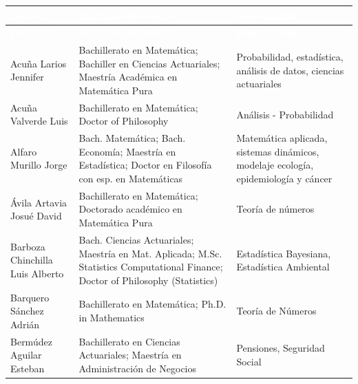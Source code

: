 
\begingroup
\small
\setlength{\tabcolsep}{4.5pt}%
\renewcommand{\arraystretch}{1.2}%
%
\setlength{\arrayrulewidth}{0.5pt}%
\begin{landscape}

\begin{longtable}{|>{\raggedright\arraybackslash}p{5cm}|>{\raggedright\arraybackslash}p{9.8cm}|>{\raggedright\arraybackslash}p{5.6cm}|}
\hline
\rowcolor{Azul-UCR}
\textcolor{white}{\textbf{Docente}} & \textcolor{white}{\textbf{Diplomas obtenidos}} & \textcolor{white}{\textbf{Especialidad}} \\ \hline
\endfirsthead
\hline
\rowcolor{Azul-UCR}
\textcolor{white}{\textbf{Docente}} & \textcolor{white}{\textbf{Diplomas obtenidos}} & \textcolor{white}{\textbf{Especialidad}} \\ \hline
\endhead
Acuña Larios Jennifer & Bachillerato en Matemática; Bachiller en Ciencias Actuariales; Maestría Académica en Matemática Pura & Probabilidad, estadística, análisis de datos, ciencias actuariales \\
\hline
Acuña Valverde Luis & Bachillerato en Matemática; Doctor of Philosophy & Análisis - Probabilidad \\
\hline
Alfaro Murillo Jorge & Bach. Matemática; Bach. Economía; Maestría en Estadística; Doctor en Filosofía con esp. en Matemáticas & Matemática aplicada, sistemas dinámicos, modelaje ecología, epidemiología y cáncer \\
\hline
Ávila Artavia Josué David & Bachillerato en Matemática; Doctorado académico en Matemática Pura & Teoría de números \\
\hline
Barboza Chinchilla Luis Alberto & Bach. Ciencias Actuariales; Maestría en Mat. Aplicada; M.Sc. Statistics Computational Finance; Doctor of Philosophy (Statistics) & Estadística Bayesiana, Estadística Ambiental \\
\hline
Barquero Sánchez Adrián & Bachillerato en Matemática; Ph.D. in Mathematics & Teoría de Números \\
\hline
Bermúdez Aguilar Esteban & Bachillerato en Ciencias Actuariales; Maestría en Administración de Negocios & Pensiones, Seguridad Social \\

\end{longtable}
\end{landscape}
